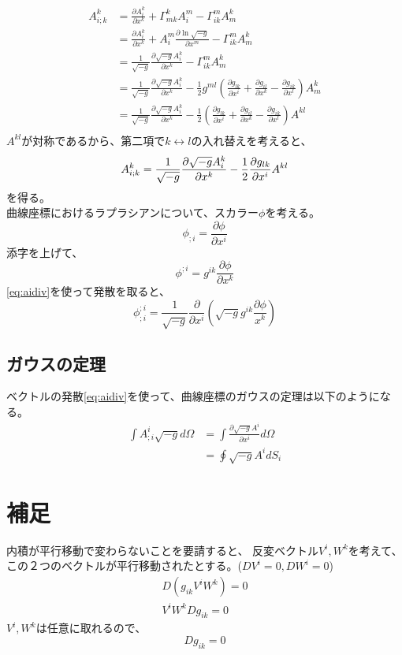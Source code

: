 \documentclass{jsarticle}
\newcommand{\pder}[2][]{\frac{\partial#1}{\partial#2}}
\begin{document}
\begin{align}
    A^k_{i;k} 
    &= 
    \pder[A^k_i]{x^k} + \Gamma^k_{mk}A^m_i - \Gamma^m_{ik}A^k_m\\
    &= 
    \pder[A^k_i]{x^k} + A^m_i\pder[\ln{\sqrt{-g}}]{x^m} - \Gamma^m_{ik}A^k_m\\
    &=
    \frac{1}{\sqrt{-g}}\frac{\partial \sqrt{-g}A^k_i}{\partial{x^{k}}}
    - \Gamma^m_{ik}A^k_m\\
    &=
    \frac{1}{\sqrt{-g}}\frac{\partial \sqrt{-g}A^k_i}{\partial{x^{k}}}
    - 
    \frac{1}{2}g^{ml} 
    \left(
    \frac{\partial{g_{lk}}}{\partial{x^{i}}}
     +
    \frac{\partial{g_{il}}}{\partial{x^{k}}}
     -
    \frac{\partial{g_{ik}}}{\partial{x^{l}}}
    \right)
    A^k_m\\
    &= 
    \frac{1}{\sqrt{-g}}\frac{\partial \sqrt{-g}A^k_i}{\partial{x^{k}}}
    - 
    \frac{1}{2} 
    \left(
    \frac{\partial{g_{lk}}}{\partial{x^{i}}}
     +
    \frac{\partial{g_{il}}}{\partial{x^{k}}}
     -
    \frac{\partial{g_{ik}}}{\partial{x^{l}}}
    \right)
    A^{kl}\\
\end{align}
$A^{kl}$が対称であるから、第二項で$k \leftrightarrow l$の入れ替えを考えると、
\begin{equation}
    A^k_{i;k} = 
    \frac{1}{\sqrt{-g}}\frac{\partial \sqrt{-g}A^k_i}{\partial{x^{k}}}
    - 
    \frac{1}{2} 
    \frac{\partial{g_{lk}}}{\partial{x^{i}}}
    A^{kl}\\
\end{equation}
を得る。\\
曲線座標におけるラプラシアンについて、スカラー$\phi$を考える。
\begin{equation}
\phi_{;i} = \pder[\phi]{x^i}
\end{equation}
添字を上げて、
\begin{equation}
    \phi^{;i} = g^{ik}\pder[\phi]{x^k}
\end{equation}
\eqref{eq:aidiv}を使って発散を取ると、
\begin{equation}
    \phi^{;i}_{;i} = 
    \frac{1}{\sqrt{-g}}
    \frac{\partial}{\partial{x^{i}}}
    \left(
        \sqrt{-g}g^{ik} \frac{\partial\phi}{x^{k}}
    \right)
\end{equation}
\subsection{ガウスの定理}
ベクトルの発散\eqref{eq:aidiv}を使って、曲線座標のガウスの定理は以下のようになる。
\begin{align}
    \int A^i_{;i} \sqrt{-g}d\Omega &= \int \pder[\sqrt{-g}A^i]{x^i}d\Omega\\
                                   &= \oint \sqrt{-g}A^idS_i
\end{align}
\section{補足}
内積が平行移動で変わらないことを要請すると、
反変ベクトル$V^i,W^k$を考えて、この２つのベクトルが平行移動されたとする。($DV^i = 0, DW^i = 0$)
\begin{align}
    D(g_{ik}V^iW^k) = 0\\
    V^iW^kDg_{ik} = 0
\end{align}
$V^i, W^k$は任意に取れるので、
\begin{equation}
    Dg_{ik} = 0
\end{equation}
\end{document}
